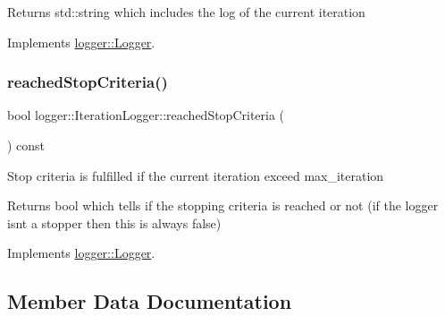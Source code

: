 \begin{DoxyReturn}{Returns}
{\ttfamily std\+::string} which includes the log of the current iteration 
\end{DoxyReturn}


Implements \mbox{\hyperlink{classlogger_1_1_logger_abad818a7e8053ca84cb267e883b5e377}{logger\+::\+Logger}}.

\mbox{\label{classlogger_1_1_iteration_logger_a8b66f0d8d2ddb7f15ca14e2b9150ea80}} 
\subsubsection{\texorpdfstring{reached\+Stop\+Criteria()}{reachedStopCriteria()}}
{\footnotesize\ttfamily bool logger\+::\+Iteration\+Logger\+::reached\+Stop\+Criteria (\begin{DoxyParamCaption}{ }\end{DoxyParamCaption}) const\hspace{0.3cm}{\ttfamily [virtual]}}



Stop criteria is fulfilled if the current iteration exceed {\ttfamily max\+\_\+iteration} 

\begin{DoxyReturn}{Returns}
{\ttfamily bool} which tells if the stopping criteria is reached or not (if the logger isn\textquotesingle{}t a stopper then this is always false) 
\end{DoxyReturn}


Implements \mbox{\hyperlink{classlogger_1_1_logger_aed91421c07062b91cee158ef2bda7ae8}{logger\+::\+Logger}}.



\subsection{Member Data Documentation}
\mbox{\label{classlogger_1_1_iteration_logger_a7c9d7b0bd792a93a6dd5d9601a10a9b4}} 
